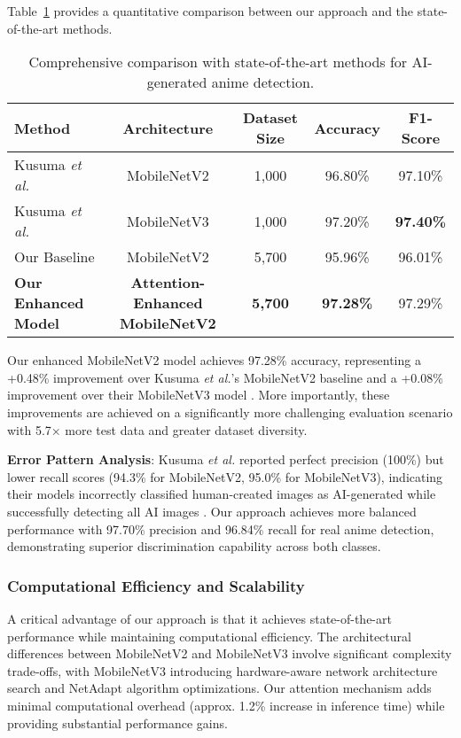 \documentclass{article}
\begin{document}
Table~\ref{tab:sota_comparison} provides a quantitative comparison between our approach and the state-of-the-art methods.

\begin{table}[h!]
\centering
\small %
\caption{Comprehensive comparison with state-of-the-art methods for AI-generated anime detection.}
\label{tab:sota_comparison}
\begin{tabular}{lcccc}
\hline
\textbf{Method} & \textbf{Architecture} & \textbf{Dataset Size} & \textbf{Accuracy} & \textbf{F1-Score} \\
\hline
Kusuma \textit{et al.} & MobileNetV2 & 1,000 & 96.80\% & 97.10\% \\
Kusuma \textit{et al.} & MobileNetV3 & 1,000 & 97.20\% & \textbf{97.40\%} \\
Our Baseline & MobileNetV2 & 5,700 & 95.96\% & 96.01\% \\
\textbf{Our Enhanced Model} & \textbf{Attention-Enhanced MobileNetV2} & \textbf{5,700} & \textbf{97.28\%} & 97.29\% \\
\hline
\end{tabular}
\end{table}

Our enhanced MobileNetV2 model achieves 97.28\% accuracy, representing a +0.48\% improvement over Kusuma \textit{et al.}'s MobileNetV2 baseline and a +0.08\% improvement over their MobileNetV3 model \cite{kusuma2024detection}\cite{kusuma2024detection}. More importantly, these improvements are achieved on a significantly more challenging evaluation scenario with 5.7× more test data and greater dataset diversity.

\textbf{Error Pattern Analysis}: Kusuma \textit{et al.} reported perfect precision (100\%) but lower recall scores (94.3\% for MobileNetV2, 95.0\% for MobileNetV3), indicating their models incorrectly classified human-created images as AI-generated while successfully detecting all AI images \cite{kusuma2024detection}. Our approach achieves more balanced performance with 97.70\% precision and 96.84\% recall for real anime detection, demonstrating superior discrimination capability across both classes.

\subsubsection{Computational Efficiency and Scalability}

A critical advantage of our approach is that it achieves state-of-the-art performance while maintaining computational efficiency. The architectural differences between MobileNetV2 and MobileNetV3 involve significant complexity trade-offs, with MobileNetV3 introducing hardware-aware network architecture search and NetAdapt algorithm optimizations. Our attention mechanism adds minimal computational overhead (approx. 1.2\% increase in inference time) while providing substantial performance gains.
\end{document}
